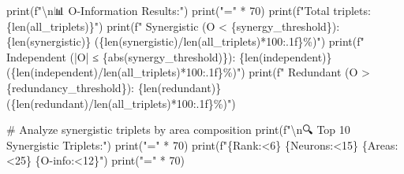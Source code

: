 \documentclass[
  11pt,
  letterpaper,
  oneside,
  openany]{book}
\newenvironment{Shaded}{\begin{snugshade}}{\end{snugshade}}
\newcommand{\BuiltInTok}[1]{\textcolor[rgb]{0.00,0.23,0.31}{#1}}
\newcommand{\CharTok}[1]{\textcolor[rgb]{0.13,0.47,0.30}{#1}}
\newcommand{\CommentTok}[1]{\textcolor[rgb]{0.37,0.37,0.37}{#1}}
\newcommand{\DecValTok}[1]{\textcolor[rgb]{0.68,0.00,0.00}{#1}}
\newcommand{\NormalTok}[1]{\textcolor[rgb]{0.00,0.23,0.31}{#1}}
\newcommand{\OperatorTok}[1]{\textcolor[rgb]{0.37,0.37,0.37}{#1}}
\newcommand{\SpecialCharTok}[1]{\textcolor[rgb]{0.37,0.37,0.37}{#1}}
\newcommand{\SpecialStringTok}[1]{\textcolor[rgb]{0.13,0.47,0.30}{#1}}
\newcommand{\StringTok}[1]{\textcolor[rgb]{0.13,0.47,0.30}{#1}}
\begin{document}
\begin{Shaded}
\begin{Highlighting}[]
\BuiltInTok{print}\NormalTok{(}\SpecialStringTok{f"}\CharTok{\textbackslash{}n}\SpecialStringTok{📊 O{-}Information Results:"}\NormalTok{)}
\BuiltInTok{print}\NormalTok{(}\StringTok{"="} \OperatorTok{*} \DecValTok{70}\NormalTok{)}
\BuiltInTok{print}\NormalTok{(}\SpecialStringTok{f"Total triplets: }\SpecialCharTok{\{}\BuiltInTok{len}\NormalTok{(all\_triplets)}\SpecialCharTok{\}}\SpecialStringTok{"}\NormalTok{)}
\BuiltInTok{print}\NormalTok{(}\SpecialStringTok{f"  Synergistic (O \textless{} }\SpecialCharTok{\{}\NormalTok{synergy\_threshold}\SpecialCharTok{\}}\SpecialStringTok{): }\SpecialCharTok{\{}\BuiltInTok{len}\NormalTok{(synergistic)}\SpecialCharTok{\}}\SpecialStringTok{ (}\SpecialCharTok{\{}\BuiltInTok{len}\NormalTok{(synergistic)}\OperatorTok{/}\BuiltInTok{len}\NormalTok{(all\_triplets)}\OperatorTok{*}\DecValTok{100}\SpecialCharTok{:.1f\}}\SpecialStringTok{\%)"}\NormalTok{)}
\BuiltInTok{print}\NormalTok{(}\SpecialStringTok{f"  Independent (|O| ≤ }\SpecialCharTok{\{}\BuiltInTok{abs}\NormalTok{(synergy\_threshold)}\SpecialCharTok{\}}\SpecialStringTok{): }\SpecialCharTok{\{}\BuiltInTok{len}\NormalTok{(independent)}\SpecialCharTok{\}}\SpecialStringTok{ (}\SpecialCharTok{\{}\BuiltInTok{len}\NormalTok{(independent)}\OperatorTok{/}\BuiltInTok{len}\NormalTok{(all\_triplets)}\OperatorTok{*}\DecValTok{100}\SpecialCharTok{:.1f\}}\SpecialStringTok{\%)"}\NormalTok{)}
\BuiltInTok{print}\NormalTok{(}\SpecialStringTok{f"  Redundant (O \textgreater{} }\SpecialCharTok{\{}\NormalTok{redundancy\_threshold}\SpecialCharTok{\}}\SpecialStringTok{): }\SpecialCharTok{\{}\BuiltInTok{len}\NormalTok{(redundant)}\SpecialCharTok{\}}\SpecialStringTok{ (}\SpecialCharTok{\{}\BuiltInTok{len}\NormalTok{(redundant)}\OperatorTok{/}\BuiltInTok{len}\NormalTok{(all\_triplets)}\OperatorTok{*}\DecValTok{100}\SpecialCharTok{:.1f\}}\SpecialStringTok{\%)"}\NormalTok{)}

\CommentTok{\# Analyze synergistic triplets by area composition}
\BuiltInTok{print}\NormalTok{(}\SpecialStringTok{f"}\CharTok{\textbackslash{}n}\SpecialStringTok{🔍 Top 10 Synergistic Triplets:"}\NormalTok{)}
\BuiltInTok{print}\NormalTok{(}\StringTok{"="} \OperatorTok{*} \DecValTok{70}\NormalTok{)}
\BuiltInTok{print}\NormalTok{(}\SpecialStringTok{f"}\SpecialCharTok{\{}\StringTok{\textquotesingle{}Rank\textquotesingle{}}\SpecialCharTok{:\textless{}6\}}\SpecialStringTok{ }\SpecialCharTok{\{}\StringTok{\textquotesingle{}Neurons\textquotesingle{}}\SpecialCharTok{:\textless{}15\}}\SpecialStringTok{ }\SpecialCharTok{\{}\StringTok{\textquotesingle{}Areas\textquotesingle{}}\SpecialCharTok{:\textless{}25\}}\SpecialStringTok{ }\SpecialCharTok{\{}\StringTok{\textquotesingle{}O{-}info\textquotesingle{}}\SpecialCharTok{:\textless{}12\}}\SpecialStringTok{"}\NormalTok{)}
\BuiltInTok{print}\NormalTok{(}\StringTok{"="} \OperatorTok{*} \DecValTok{70}\NormalTok{)}


\end{Highlighting}
\end{Shaded}
\end{document}
